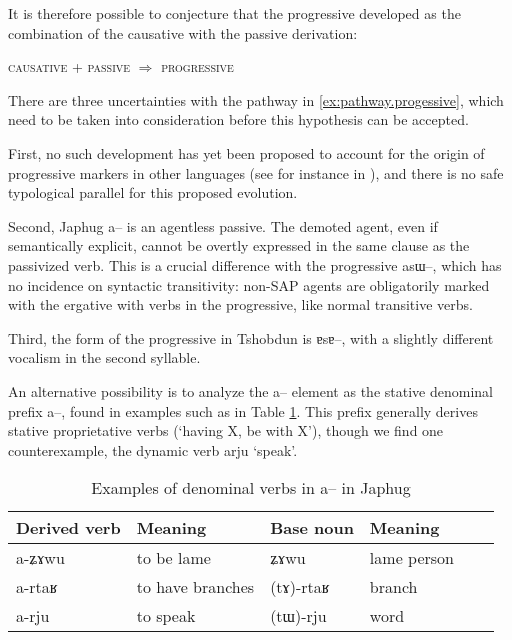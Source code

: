 \documentclass[oldfontcommands,oneside,a4paper,11pt]{article}
\newcommand{\ipa}[1]{{\phon \mbox{#1}}} %
\begin{document}
It is therefore possible to conjecture that the progressive developed as the combination of the causative with the passive derivation:

\begin{exe}
\ex \label{ex:pathway.progessive}
\glt \textsc{causative} + \textsc{passive} $\Rightarrow$ \textsc{progressive}
\end{exe}

There are three uncertainties with the pathway in \ref{ex:pathway.progessive}, which need to be taken into consideration before this hypothesis can be accepted.

First, no such development has yet been proposed to account for the origin of progressive markers in other languages (see for instance in \citealt{bybee94TAM, heine-kuteva02}), and there is no safe typological parallel for this proposed evolution.

Second, Japhug \ipa{a--} is an agentless passive. The demoted agent, even if semantically explicit, cannot be overtly expressed in the same clause as the passivized verb. This is a crucial difference with the progressive \ipa{asɯ--}, which has no incidence on syntactic transitivity: non-SAP agents are obligatorily marked with the ergative with verbs in the progressive, like normal transitive verbs.


Third, the form of the progressive in Tshobdun is \ipa{ɐsɐ--}, with a slightly different vocalism in the second syllable.

An alternative possibility is to analyze the \ipa{a--} element as the stative denominal prefix \ipa{a--}, found in examples such as in Table \ref{tab:denom.a.ex}. This prefix generally derives stative proprietative verbs (`having X, be with X'), though we find one counterexample, the dynamic verb \ipa{arju} `speak'.


 \begin{table}[H] \label{tab:denom.a.ex} \centering
 \caption{Examples of denominal verbs in \ipa{a}--   in Japhug}
\begin{tabular}{llllll}
\toprule
   Derived verb& Meaning &Base noun  & Meaning \\
\midrule
  \ipa{a-ʑɤwu} & to be lame & \ipa{ʑɤwu} & lame person\\
  \ipa{a-rtaʁ} & to have branches & \ipa{(tɤ)-rtaʁ} & branch \\
  \ipa{a-rju} & to speak & \ipa{(tɯ)-rju} & word \\
\bottomrule
\end{tabular}
\end{table}
\end{document}
